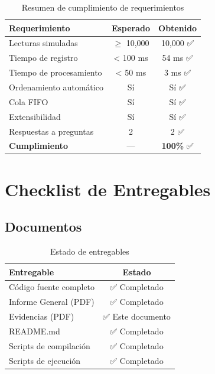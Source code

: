\documentclass[12pt,a4paper]{article}
\begin{document}
\begin{table}[h]
\centering
\begin{tabular}{|l|c|c|}
\hline
\rowcolor{agrogreen!20}
\textbf{Requerimiento} & \textbf{Esperado} & \textbf{Obtenido} \\
\hline
Lecturas simuladas & $\geq$ 10,000 & 10,000 ✅ \\
Tiempo de registro & < 100 ms & 54 ms ✅ \\
Tiempo de procesamiento & < 50 ms & 3 ms ✅ \\
Ordenamiento automático & Sí & Sí ✅ \\
Cola FIFO & Sí & Sí ✅ \\
Extensibilidad & Sí & Sí ✅ \\
Respuestas a preguntas & 2 & 2 ✅ \\
\hline
\textbf{Cumplimiento} & --- & \textbf{100\%} ✅ \\
\hline
\end{tabular}
\caption{Resumen de cumplimiento de requerimientos}
\label{tab:cumplimiento}
\end{table}


\section{Checklist de Entregables}

\subsection{Documentos}

\begin{table}[h]
\centering
\begin{tabular}{|l|c|}
\hline
\rowcolor{evidenceblue!20}
\textbf{Entregable} & \textbf{Estado} \\
\hline
Código fuente completo & ✅ Completado \\
Informe General (PDF) & ✅ Completado \\
Evidencias (PDF) & ✅ Este documento \\
README.md & ✅ Completado \\
Scripts de compilación & ✅ Completado \\
Scripts de ejecución & ✅ Completado \\
\hline
\end{tabular}
\caption{Estado de entregables}
\label{tab:entregables}
\end{table}
\end{document}
